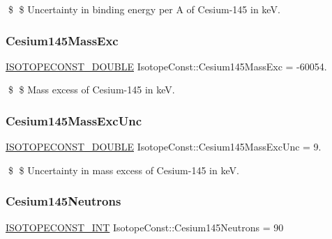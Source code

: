 \$ \$ Uncertainty in binding energy per A of Cesium-\/145 in keV. \mbox{\label{group___isotope_const-_cesium-_cs145_ga2bc3509a0ed6ce4ace24a7cb9e974b67}} 
\subsubsection{\texorpdfstring{Cesium145\+Mass\+Exc}{Cesium145MassExc}}
{\footnotesize\ttfamily \mbox{\hyperlink{group___isotope_const-_macros_ga8f45a7272ce02c0b4c65c44636ed719a}{I\+S\+O\+T\+O\+P\+E\+C\+O\+N\+S\+T\+\_\+\+D\+O\+U\+B\+LE}} Isotope\+Const\+::\+Cesium145\+Mass\+Exc = -\/60054.}

\$ \$ Mass excess of Cesium-\/145 in keV. \mbox{\label{group___isotope_const-_cesium-_cs145_ga30ac31dbe26d5edade16e2656e73e1bf}} 
\subsubsection{\texorpdfstring{Cesium145\+Mass\+Exc\+Unc}{Cesium145MassExcUnc}}
{\footnotesize\ttfamily \mbox{\hyperlink{group___isotope_const-_macros_ga8f45a7272ce02c0b4c65c44636ed719a}{I\+S\+O\+T\+O\+P\+E\+C\+O\+N\+S\+T\+\_\+\+D\+O\+U\+B\+LE}} Isotope\+Const\+::\+Cesium145\+Mass\+Exc\+Unc = 9.}

\$ \$ Uncertainty in mass excess of Cesium-\/145 in keV. \mbox{\label{group___isotope_const-_cesium-_cs145_gad6cd01399b113ce5a4dc2343e1cacf05}} 
\subsubsection{\texorpdfstring{Cesium145\+Neutrons}{Cesium145Neutrons}}
{\footnotesize\ttfamily \mbox{\hyperlink{group___isotope_const-_macros_ga5f18360b3e99483a35c32d789e62621c}{I\+S\+O\+T\+O\+P\+E\+C\+O\+N\+S\+T\+\_\+\+I\+NT}} Isotope\+Const\+::\+Cesium145\+Neutrons = 90}

